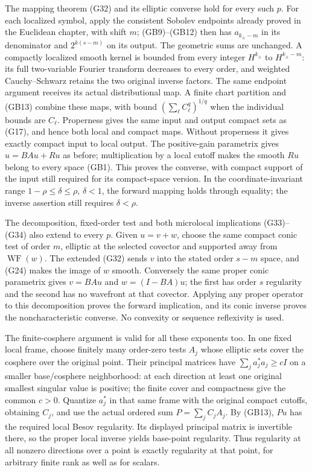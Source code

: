 \documentclass[
  11pt,
]{article}
\begin{document}
The mapping theorem (G32) and its elliptic converse hold for every such
\(p\). For each localized symbol, apply the consistent Sobolev endpoints
already proved in the Euclidean chapter, with shift \(m\); (GB9)--(GB12)
then has \(a_{k_\pm-m}\) in its denominator and \(2^{k(s-m)}\) on its
output. The geometric sums are unchanged. A compactly localized smooth
kernel is bounded from every integer \(H^{k_\pm}\) to \(H^{k_\pm-m}\):
its full two-variable Fourier transform decreases to every order, and
weighted Cauchy--Schwarz retains the two original inverse factors. The
same endpoint argument receives its actual distributional map. A finite
chart partition and (GB13) combine these maps, with bound
\((\sum_\ell C_\ell^q)^{1/q}\) when the individual bounds are
\(C_\ell\). Properness gives the same input and output compact sets as
(G17), and hence both local and compact maps. Without properness it
gives exactly compact input to local output. The positive-gain
parametrix gives \(u=BAu+Ru\) as before; multiplication by a local
cutoff makes the smooth \(Ru\) belong to every space (GB1). This proves
the converse, with compact support of the input still required for its
compact-space version. In the coordinate-invariant range
\(1-\rho\le\delta\le\rho\), \(\delta<1\), the forward mapping holds
through equality; the inverse assertion still requires \(\delta<\rho\).

The decomposition, fixed-order test and both microlocal implications
(G33)--(G34) also extend to every \(p\). Given \(u=v+w\), choose the
same compact conic test of order \(m\), elliptic at the selected
covector and supported away from \(\operatorname{WF}(w)\). The extended
(G32) sends \(v\) into the stated order \(s-m\) space, and (G24) makes
the image of \(w\) smooth. Conversely the same proper conic parametrix
gives \(v=BAu\) and \(w=(I-BA)u\); the first has order \(s\) regularity
and the second has no wavefront at that covector. Applying any proper
operator to this decomposition proves the forward implication, and its
conic inverse proves the noncharacteristic converse. No convexity or
sequence reflexivity is used.

The finite-cosphere argument is valid for all these exponents too. In
one fixed local frame, choose finitely many order-zero tests \(A_j\)
whose elliptic sets cover the cosphere over the original point. Their
principal matrices have \(\sum_j a_j^*a_j\ge cI\) on a smaller
base/cosphere neighborhood: at each direction at least one original
smallest singular value is positive; the finite cover and compactness
give the common \(c>0\). Quantize \(a_j^*\) in that same frame with the
original compact cutoffs, obtaining \(C_j\), and use the actual ordered
sum \(P=\sum_j C_jA_j\). By (GB13), \(Pu\) has the required local Besov
regularity. Its displayed principal matrix is invertible there, so the
proper local inverse yields base-point regularity. Thus regularity at
all nonzero directions over a point is exactly regularity at that point,
for arbitrary finite rank as well as for scalars.
\end{document}
